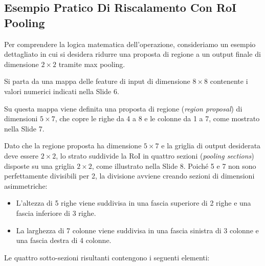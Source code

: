 ﻿\documentclass[11pt, a4paper]{article}
\begin{document}
\newpage

\subsection{Esempio Pratico Di Riscalamento Con RoI Pooling}

Per comprendere la logica matematica dell'operazione, consideriamo un esempio dettagliato in cui si desidera ridurre una proposta di regione a un output finale di dimensione $2 \times 2$ tramite max pooling.


Si parta da una mappa delle feature di input di dimensione $8 \times 8$ contenente i valori numerici indicati nella Slide 6.


Su questa mappa viene definita una proposta di regione (\emph{region proposal}) di dimensioni $5 \times 7$, che copre le righe da 4 a 8 e le colonne da 1 a 7, come mostrato nella Slide 7.


Dato che la regione proposta ha dimensione $5 \times 7$ e la griglia di output desiderata deve essere $2 \times 2$, lo strato suddivide la RoI in quattro sezioni (\emph{pooling sections}) disposte su una griglia $2 \times 2$, come illustrato nella Slide 8. Poiché 5 e 7 non sono perfettamente divisibili per 2, la divisione avviene creando sezioni di dimensioni asimmetriche:
\begin{itemize}
    \item L'altezza di 5 righe viene suddivisa in una fascia superiore di 2 righe e una fascia inferiore di 3 righe.
    \item La larghezza di 7 colonne viene suddivisa in una fascia sinistra di 3 colonne e una fascia destra di 4 colonne.
\end{itemize}

Le quattro sotto-sezioni risultanti contengono i seguenti elementi:
\end{document}
